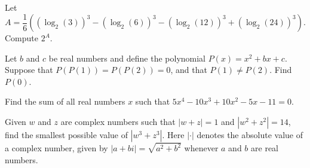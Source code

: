 \documentclass[11pt]{article}
\theoremstyle{definition}
\begin{document}
%	




\begin{question}[name={2014 HMMT, Algebra, \href{https://artofproblemsolving.com/community/c129h577667p3406435}{Problem 3}}]
	Let\[ A = \frac{1}{6}((\log_2(3))^3-(\log_2(6))^3-(\log_2(12))^3+(\log_2(24))^3).\]
	Compute $2^A$.
\end{question}



%	



\begin{question}[name={2014 HMMT, Algebra, \href{https://artofproblemsolving.com/community/c129h577668p3406438}{Problem 4}}]
	Let $b$ and $c$ be real numbers and define the polynomial $P(x)=x^2+bx+c$. Suppose that $P(P(1))=P(P(2))=0$, and that $P(1) \neq P(2)$. Find $P(0)$.
\end{question}




%	




\begin{question}[name={2014 HMMT, Algebra, \href{https://artofproblemsolving.com/community/c129h577669p3406441}{Problem 5}}]
	Find the sum of all real numbers $x$ such that $5x^4-10x^3+10x^2-5x-11=0$.
\end{question}




%	




\begin{question}[name={2014 HMMT, Algebra, \href{https://artofproblemsolving.com/community/c129h577670p3406448}{Problem 6}}]
	Given $w$ and $z$ are complex numbers such that $|w+z|=1$ and $|w^2+z^2|=14$, find the smallest possible value of $|w^3+z^3|$. Here $| \cdot |$ denotes the absolute value of a complex number, given by $|a+bi|=\sqrt{a^2+b^2}$ whenever $a$ and $b$ are real numbers.
\end{question}
\end{document}
